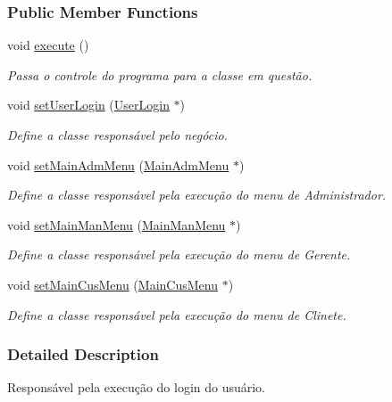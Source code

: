 \subsubsection*{Public Member Functions}
\begin{DoxyCompactItemize}
\item 
void \hyperlink{classMainLogin_ab0149573d015f41f401cfb28aea35509}{execute} ()
\begin{DoxyCompactList}\small\item\em Passa o controle do programa para a classe em questão. \end{DoxyCompactList}\item 
void \hyperlink{classMainLogin_a286c0703647c7c252093bf7589f63c64}{set\-User\-Login} (\hyperlink{classUserLogin}{User\-Login} $\ast$)
\begin{DoxyCompactList}\small\item\em Define a classe responsável pelo negócio. \end{DoxyCompactList}\item 
void \hyperlink{classMainLogin_a0161cf5b7b4d5d829292a38e4059abb5}{set\-Main\-Adm\-Menu} (\hyperlink{classMainAdmMenu}{Main\-Adm\-Menu} $\ast$)
\begin{DoxyCompactList}\small\item\em Define a classe responsável pela execução do menu de Administrador. \end{DoxyCompactList}\item 
void \hyperlink{classMainLogin_a4561c5838a48ad8436cd8d0b1749511a}{set\-Main\-Man\-Menu} (\hyperlink{classMainManMenu}{Main\-Man\-Menu} $\ast$)
\begin{DoxyCompactList}\small\item\em Define a classe responsável pela execução do menu de Gerente. \end{DoxyCompactList}\item 
void \hyperlink{classMainLogin_a2302b88c01b0ea4b29e4a824c5b7f185}{set\-Main\-Cus\-Menu} (\hyperlink{classMainCusMenu}{Main\-Cus\-Menu} $\ast$)
\begin{DoxyCompactList}\small\item\em Define a classe responsável pela execução do menu de Clinete. \end{DoxyCompactList}\end{DoxyCompactItemize}


\subsubsection{Detailed Description}
Responsável pela execução do login do usuário. 



